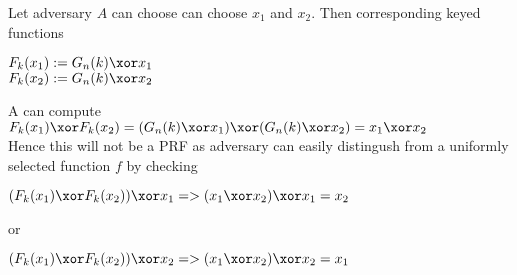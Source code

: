 Let adversary $A$ can choose can choose $x_1$ and $x_2$. Then corresponding keyed functions 
\begin{center}
    $ F_k(x_1) := G_n(k) \xor x_1 $ \\
    $ F_k(x_2) := G_n(k) \xor x_2 $ \\
\end{center}

A can compute $ F_k(x_1) \xor F_k(x_2) =  (G_n(k) \xor x_1) \xor (G_n(k) \xor x_2) =  x_1 \xor x_2 $ \\

Hence this will not be a PRF as adversary can easily distingush from a uniformly selected function $f$ by checking 

\begin{center}
    $ (F_k(x_1) \xor F_k(x_2) ) \xor x_1 => (x_1 \xor x_2) \xor x_1  = x_2$
\end{center}

or 
\begin{center}
    $ (F_k(x_1) \xor F_k(x_2) ) \xor x_2 => (x_1 \xor x_2) \xor x_2  = x_1$
\end{center}










